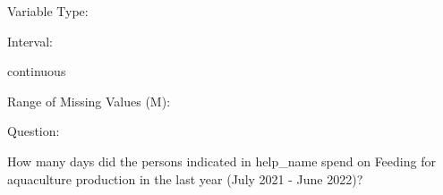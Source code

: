 \documentclass[
]{article}
\begin{document}
\begin{minipage}[t]{0.3\linewidth}

Variable Type:

\end{minipage}%
\begin{minipage}[t]{0.7\linewidth}

\end{minipage}

\begin{minipage}[t]{0.3\linewidth}

Interval:

\end{minipage}%
\begin{minipage}[t]{0.7\linewidth}

continuous

\end{minipage}

\begin{minipage}[t]{0.3\linewidth}

Range of Missing Values (M):

\end{minipage}%
\begin{minipage}[t]{0.7\linewidth}

\end{minipage}

\begin{minipage}[t]{0.3\linewidth}

Question:

\end{minipage}%
\begin{minipage}[t]{0.7\linewidth}

How many days did the persons indicated in help\_name spend on Feeding
for aquaculture production in the last year (July 2021 - June 2022)?

\end{minipage}

\begin{minipage}[t]{0.3\linewidth}

~

\end{minipage}%
\begin{minipage}[t]{0.7\linewidth}

~

\end{minipage}
 \vspace*{-6mm} 

\begin{minipage}[t]{0.3\linewidth}

~

\end{minipage}%
\begin{minipage}[t]{0.7\linewidth}

~

\end{minipage}
 \vspace*{-4mm} 
\end{document}
